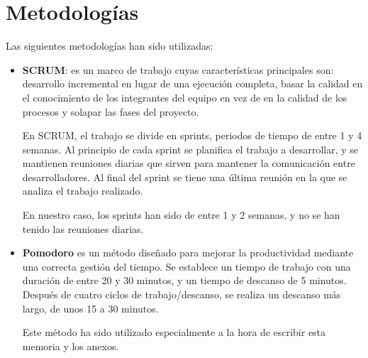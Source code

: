 

\section{Metodologías}

Las siguientes metodologías han sido utilizadas:
\begin{itemize}
    \item \textbf{SCRUM}: es un marco de trabajo cuyas características principales son: desarrollo incremental
        en lugar de una ejecución completa, basar la calidad en el conocimiento de los integrantes del
        equipo en vez de en la calidad de los procesos y solapar las fases del proyecto.

        En SCRUM, el trabajo se divide en sprints, periodos de tiempo de entre 1 y 4 semanas. Al principio
        de cada sprint se planifica el trabajo a desarrollar, y se mantienen reuniones diarias que sirven para 
        mantener la comunicación entre desarrolladores. Al final del sprint se tiene una última reunión en la que
        se analiza el trabajo realizado.

        En nuestro caso, los sprints han sido de entre 1 y 2 semanas, y no se han tenido las reuniones diarias.
    \item \textbf{Pomodoro} es un método diseñado para mejorar la productividad mediante una correcta gestión del tiempo.
        Se establece un tiempo de trabajo con una duración de entre 20 y 30 minutos, y un tiempo de descanso de
        5 minutos. Después de cuatro ciclos de trabajo/descanso, se realiza un descanso más largo, de unos 15 a 30
        minutos.

        Este método ha sido utilizado especialmente a la hora de escribir esta memoria y los anexos.
\end{itemize}

